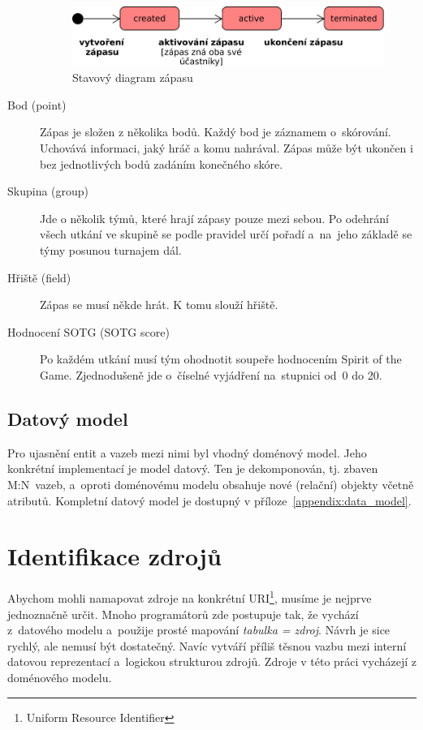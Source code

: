 \begin{description}
\begin{figure}[ht!]
      \centering
      \includegraphics[width=110mm]{./images/stavovy-diagram-zapas.pdf}
      \caption{Stavový diagram zápasu\label{overflow}}
      \label{fig:state_match}
    \end{figure}
  \item[Bod (point)]
    Zápas je složen z několika bodů. Každý bod je záznamem o~skórování. Uchovává informaci, jaký hráč a komu nahrával.
    Zápas může být ukončen i bez jednotlivých bodů zadáním konečného skóre.
  \item[Skupina (group)]
    Jde o několik týmů, které hrají zápasy pouze mezi sebou. Po odehrání všech utkání ve skupině se podle pravidel určí pořadí a~na~jeho základě se týmy posunou turnajem dál.
  \item[Hřiště (field)]
    Zápas se musí někde hrát. K tomu slouží hřiště.
  \item[Hodnocení SOTG (SOTG score)]
    Po každém utkání musí tým ohodnotit soupeře hodnocením Spirit of the Game. Zjednodušeně jde o~číselné vyjádření na~stupnici od~0 do 20.
\end{description}

\subsection{Datový model}

Pro ujasnění entit a vazeb mezi nimi byl vhodný doménový model. Jeho konkrétní implementací je model datový.
Ten je dekomponován, tj. zbaven M:N~vazeb, a~oproti doménovému modelu obsahuje nové
(relační) objekty včetně atributů. Kompletní datový model je dostupný v příloze~\ref{appendix:data_model}.

\section{Identifikace zdrojů}

Abychom mohli namapovat zdroje na konkrétní URI\footnote{Uniform Resource Identifier},
musíme je nejprve jedno\-značně určit. Mnoho programátorů zde postupuje tak, že vychází
z~datového modelu a~použije prosté mapování \textit{tabulka = zdroj}.
Návrh je sice rychlý, ale nemusí být dostatečný. Navíc vytváří příliš těsnou vazbu mezi interní datovou reprezentací
a~logickou strukturou zdrojů. Zdroje v této práci vycházejí z doménového modelu.

